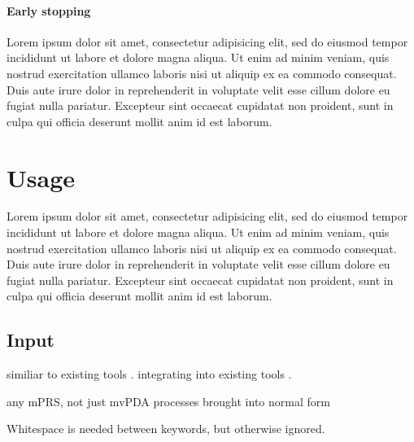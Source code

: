 \paragraph{Early stopping}

Lorem ipsum dolor sit amet, consectetur adipisicing elit, sed do eiusmod tempor incididunt ut labore et dolore magna aliqua. Ut enim ad minim veniam, quis nostrud exercitation ullamco laboris nisi ut aliquip ex ea commodo consequat. Duis aute irure dolor in reprehenderit in voluptate velit esse cillum dolore eu fugiat nulla pariatur. Excepteur sint occaecat cupidatat non proident, sunt in culpa qui officia deserunt mollit anim id est laborum.

\section{Usage}

Lorem ipsum dolor sit amet, consectetur adipisicing elit, sed do eiusmod tempor incididunt ut labore et dolore magna aliqua. Ut enim ad minim veniam, quis nostrud exercitation ullamco laboris nisi ut aliquip ex ea commodo consequat. Duis aute irure dolor in reprehenderit in voluptate velit esse cillum dolore eu fugiat nulla pariatur. Excepteur sint occaecat cupidatat non proident, sunt in culpa qui officia deserunt mollit anim id est laborum.

\subsection{Input}

similiar to existing tools \cite{Sickert12}.
integrating into existing tools \cite{Stoll11}.

any mPRS, not just mvPDA
processes brought into normal form

Whitespace is needed between keywords, but otherwise ignored.

